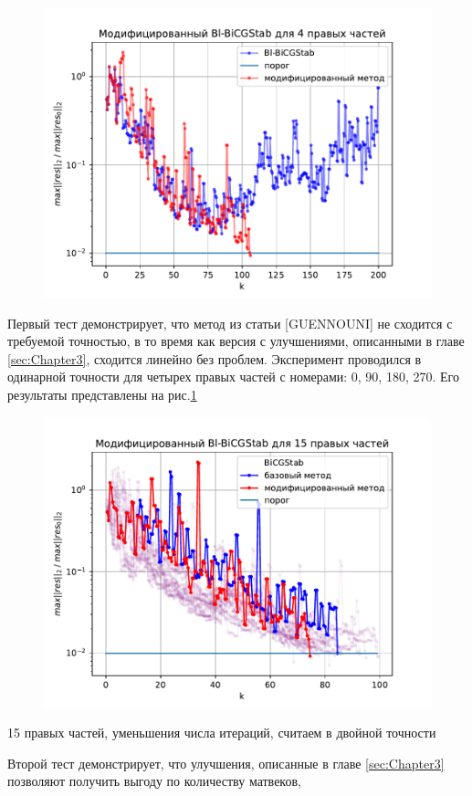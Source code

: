 \begin{figure}[H]
    \centering
    \includegraphics[width=0.7\linewidth]{images/4.pdf}
    \caption{}
    \label{fig:4}
\end{figure} 
\par Первый тест демонстрирует, что метод из статьи [GUENNOUNI] не сходится с требуемой точностью, в то время как 
версия с улучшениями, описанными в главе \ref{sec:Chapter3}, сходится линейно без проблем. 
Эксперимент проводился в одинарной точности для четырех правых частей с номерами: 0, 90, 180, 270. Его результаты представлены
на рис.\ref{fig:4}
\begin{figure}[H]
    \centering
    \includegraphics[width=0.7\linewidth]{images/acceleration_15_rhs.pdf}
    \caption{}
    \label{fig:acceleration_15}
\end{figure}
\par 15 правых частей, уменьшения числа итераций, считаем в двойной точности
\par Второй тест демонстрирует, что улучшения, описанные в главе \ref{sec:Chapter3} позволяют получить выгоду по количеству матвеков,
